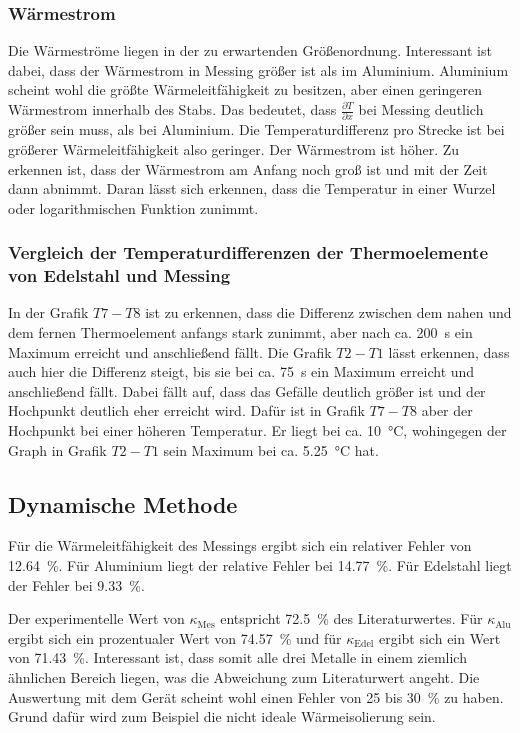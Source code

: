 \subsubsection{Wärmestrom}
Die Wärmeströme liegen in der zu erwartenden Größenordnung. Interessant ist dabei, dass der Wärmestrom in Messing größer ist als im Aluminium. 
Aluminium scheint wohl die größte Wärmeleitfähigkeit zu besitzen, aber einen geringeren Wärmestrom innerhalb des Stabs.
Das bedeutet, dass $\frac{\partial T}{\partial x}$ bei Messing deutlich größer sein muss, als bei Aluminium.
Die Temperaturdifferenz pro Strecke ist bei größerer Wärmeleitfähigkeit also geringer. Der Wärmestrom ist höher. %
Zu erkennen ist, dass der Wärmestrom am Anfang noch groß ist und mit der Zeit dann abnimmt. Daran lässt sich erkennen, dass die Temperatur 
in einer Wurzel oder logarithmischen Funktion zunimmt.

\subsubsection{Vergleich der Temperaturdifferenzen der Thermoelemente von Edelstahl und Messing}
In der Grafik $T7-T8$ ist zu erkennen, dass die Differenz zwischen dem nahen und dem fernen Thermoelement anfangs stark zunimmt, aber nach ca. 
\SI{200}{\second} ein Maximum erreicht und anschließend fällt. Die Grafik $T2-T1$ lässt erkennen, dass auch hier die 
Differenz steigt, bis sie bei ca. \SI{75}{\second} ein Maximum erreicht und anschließend fällt.
Dabei fällt auf, dass das Gefälle deutlich größer ist und der Hochpunkt deutlich eher erreicht wird. Dafür ist in Grafik 
$T7-T8$ aber der Hochpunkt bei einer höheren Temperatur. Er liegt bei ca. \SI{10}{\degreeCelsius}, wohingegen der Graph in Grafik $T2-T1$ sein
Maximum bei ca. \SI{5.25}{\degreeCelsius} hat.

\subsection{Dynamische Methode}
Für die Wärmeleitfähigkeit des Messings ergibt sich ein relativer Fehler von \SI{12.64}{\percent}. Für Aluminium liegt der relative 
Fehler bei \SI{14.77}{\percent}. Für Edelstahl liegt der Fehler bei \SI{9.33}{\percent}. 

\noindent Der experimentelle Wert von $\kappa_\text{Mes}$ entspricht \SI{72.5}{\percent} des Literaturwertes. 
Für $\kappa_\text{Alu}$ ergibt sich ein prozentualer Wert von \SI{74.57}{\percent} und für $\kappa_\text{Edel}$ ergibt sich ein Wert 
von \SI{71.43}{\percent}. Interessant ist, dass somit alle drei Metalle in einem ziemlich ähnlichen Bereich liegen, was die Abweichung zum 
Literaturwert angeht. 
Die Auswertung mit dem Gerät scheint wohl einen Fehler von \num{25} bis \SI{30}{\percent} zu haben. Grund dafür wird zum Beispiel die 
nicht ideale Wärmeisolierung sein.